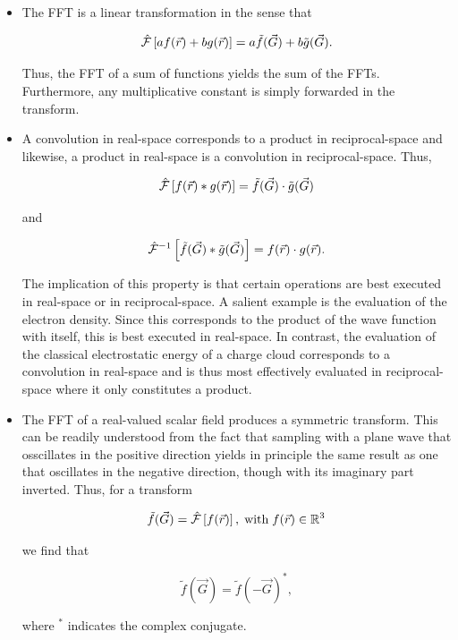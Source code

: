 \begin{itemize}
    \item 

    The FFT is a linear transformation in the sense that

    \begin{equation}
        \hat{\mathcal{F}}\left[a f(\vec{r}) + bg(\vec{r}) \right] = a\tilde{f}(\vec{G}) + b\tilde{g}(\vec{G}).
    \end{equation}
    
    Thus, the FFT of a sum of functions yields the sum of the FFTs. Furthermore, any multiplicative constant is simply forwarded in the transform.

    \item 

    A convolution in real-space corresponds to a product in reciprocal-space and likewise, a product in real-space is a convolution in reciprocal-space. Thus,

    \begin{equation}
        \hat{\mathcal{F}}\left[f(\vec{r}) \ast g(\vec{r}) \right] = \tilde{f}(\vec{G}) \cdot \tilde{g}(\vec{G})
    \end{equation}

    and

    \begin{equation}
        \hat{\mathcal{F}}^{-1}\left[\tilde{f}(\vec{G}) \ast \tilde{g}(\vec{G}) \right] = f(\vec{r}) \cdot g(\vec{r}).
    \end{equation}

    The implication of this property is that certain operations are best executed in real-space or in reciprocal-space. A salient example is the evaluation of the electron density. Since this corresponds to the product of the wave function with itself, this is best executed in real-space. In contrast, the evaluation of the classical electrostatic energy of a charge cloud corresponds to a convolution in real-space and is thus most effectively evaluated in reciprocal-space where it only constitutes a product.

    \item

    The FFT of a real-valued scalar field produces a symmetric transform. This can be readily understood from the fact that sampling with a plane wave that osscillates in the positive direction yields in principle the same result as one that oscillates in the negative direction, though with its imaginary part inverted. Thus, for a transform
    
    \begin{equation}
        \tilde{f}(\vec{G}) = \hat{\mathcal{F}}\left[f(\vec{r})\right],\;\text{with}\;f(\vec{r}) \in \mathbb{R}^{3}
    \end{equation}
    
    we find that
    
    \begin{equation}
        \tilde{f}(\vec{G}) = \tilde{f}(-\vec{G})^{*},
    \end{equation}

    where $^{*}$ indicates the complex conjugate.
    
\end{itemize}

